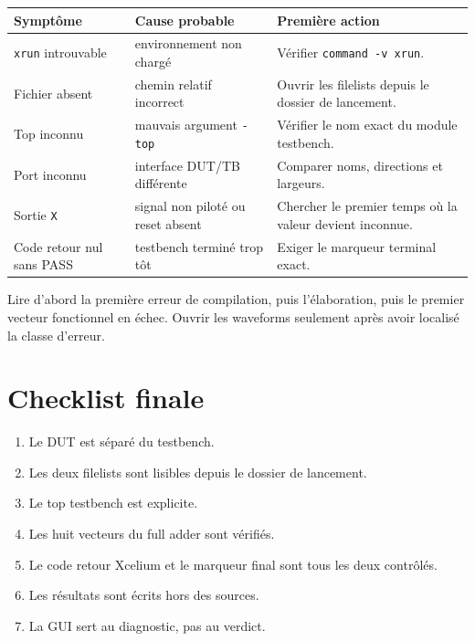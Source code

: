 \documentclass[11pt,a4paper,openany]{report}
\begin{document}
\begin{longtable}{p{}p{}p{}}
\toprule
Symptôme & Cause probable & Première action \\
\midrule
\texttt{xrun} introuvable & environnement non chargé &
Vérifier \texttt{command -v xrun}. \\
Fichier absent & chemin relatif incorrect & Ouvrir les filelists depuis le
dossier de lancement. \\
Top inconnu & mauvais argument \texttt{-top} & Vérifier le nom exact du module
testbench. \\
Port inconnu & interface DUT/TB différente & Comparer noms, directions et
largeurs. \\
Sortie \texttt{X} & signal non piloté ou reset absent & Chercher le premier
temps où la valeur devient inconnue. \\
Code retour nul sans PASS & testbench terminé trop tôt & Exiger le marqueur
terminal exact. \\
\bottomrule
\end{longtable}

\begin{failurebox}
Lire d'abord la première erreur de compilation, puis l'élaboration, puis le
premier vecteur fonctionnel en échec. Ouvrir les waveforms seulement après
avoir localisé la classe d'erreur.
\end{failurebox}

\appendix
\chapter{Checklist finale}

\begin{enumerate}
  \item Le DUT est séparé du testbench.
  \item Les deux filelists sont lisibles depuis le dossier de lancement.
  \item Le top testbench est explicite.
  \item Les huit vecteurs du full adder sont vérifiés.
  \item Le code retour Xcelium et le marqueur final sont tous les deux contrôlés.
  \item Les résultats sont écrits hors des sources.
  \item La GUI sert au diagnostic, pas au verdict.
\end{enumerate}
\end{document}
